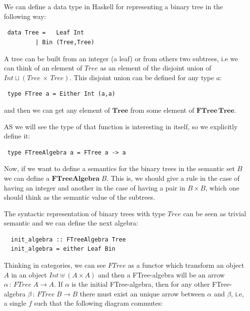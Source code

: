\documentclass[a4paper,10pt]{article}
\begin{document}
\

\

We can define a data type in Haskell for representing a binary tree in the following way:

\begin{lstlisting}
 data Tree =   Leaf Int 
	     | Bin (Tree,Tree)
\end{lstlisting}

A tree can be built from an integer (a leaf) or from others two subtrees, i.e we
can think of an element of $Tree$ as an element of the disjoint union of 
$Int \sqcup (Tree\,\times\,Tree)$. This disjoint union can be defined for any
type $a$:

\begin{lstlisting}
 type FTree a = Either Int (a,a)
\end{lstlisting}

\noindent and then we can get any element of $\mathbf{Tree}$ from some element
of $\mathbf{FTree\,Tree}$.

AS we will see the type of that function is interesting in itself, so we explicitly
define it:

\begin{lstlisting}
 type FTreeAlgebra a = FTree a -> a
\end{lstlisting}

Now, if we want to define a semantics for the binary trees in the semantic set $B$ we can
define a $\mathbf{FTreeAlgebra}\;B$. This is, we should give a rule in the case of having
an integer and another in the case of having a pair in $B \times B$, which one should think
as the semantic value of the subtrees.

The syntactic representation of binary trees with type $Tree$ can be seen as
trivial semantic and we can define the next algebra:

\begin{lstlisting}
  init_algebra :: FTreeAlgebra Tree
  init_algebra = either Leaf Bin
\end{lstlisting}

Thinking in categories, we can see $FTree$ as a functor which transform an object $A$ in
an object $Int \uplus (A \times A)$ and then a FTree-algebra will be an arrow 
$\alpha\,:\,FTree\;A \rightarrow A$. If $\alpha$ is the initial FTree-algebra, then for
any other FTree-algebra $\beta\,:\,FTree\;B \rightarrow B$ there must exist an unique arrow
between $\alpha$ and $\beta$, i.e, a single $f$ such that the following diagram commutes:
\end{document}
